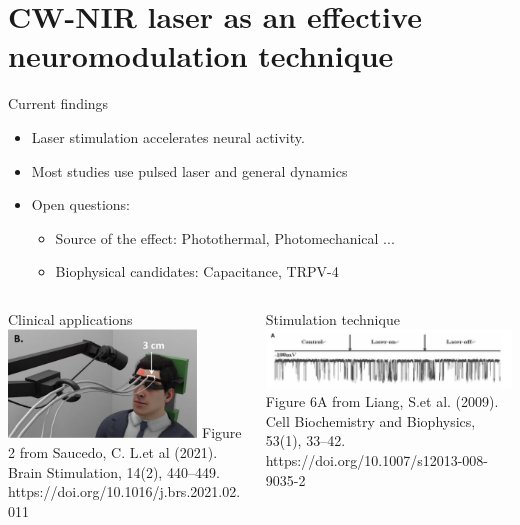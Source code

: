 \documentclass[aspectratio=43]{beamer}
\begin{document}
\section[CW-NIR Neuromodulation]{CW-NIR laser as an effective neuromodulation technique}
\begin{frame}{Current findings}
	\begin{itemize}
		\item{Laser stimulation accelerates neural activity.}
		\item{Most studies use pulsed laser and general dynamics}
		\item{Open questions:}
		\begin{itemize}
			\item Source of the effect: Photothermal, Photomechanical ...
			\item Biophysical candidates: Capacitance, TRPV-4 
		\end{itemize}
	\end{itemize}

	\begin{columns}
		\begin{column}{0.5\textwidth}
			\centering
			Clinical applications\\
			\includegraphics[width=0.8\textwidth]{Images/saucedo.png} \tiny{Figure 2 from Saucedo, C. L.et al (2021). Brain Stimulation, 14(2), 440–449. https://doi.org/10.1016/j.brs.2021.02.011}
		\end{column}
		\begin{column}{0.5\textwidth}
			\centering
			Stimulation technique\\
			\includegraphics[width=\textwidth]{Images/liang.png} \tiny{Figure 6A from Liang, S.et al. (2009). Cell Biochemistry and Biophysics, 53(1), 33–42. https://doi.org/10.1007/s12013-008-9035-2
			}
		\end{column}	
	\end{columns}
	
	
\end{frame}
\end{document}
